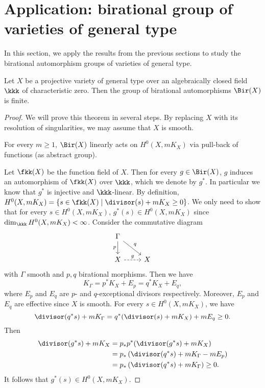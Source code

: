 \section{Application: birational group of varieties of general type}

    In this section, we apply the results from the previous sections to study the birational automorphism groups of varieties of general type.

    \begin{theorem}\label{thm:birational_group_of_varieties_of_general_type}
        Let \(X\) be a projective variety of general type over an algebraically closed field \(\kkk\) of characteristic zero. 
        Then the group of birational automorphisms \(\Bir(X)\) is finite.
    \end{theorem}
    \begin{proof}
        We will prove this theorem in several steps.
        By replacing \(X\) with its resolution of singularities, we may assume that \(X\) is smooth.

        \begin{step}\label{step_in_thm:birational_group_of_varieties_of_general_type:pluricanonical_representation}
            For every \(m \geq 1\), \(\Bir(X)\) linearly acts on \(H^0(X, mK_X)\) via pull-back of functions (as abstract group).
        \end{step}

        Let \(\fkk(X)\) be the function field of \(X\).
        Then for every \(g \in \Bir(X)\), \(g\) induces an automorphism of \(\fkk(X)\) over \(\kkk\), which we denote by \(g^*\).
        In particular we know that \(g^*\) is injective and \(\kkk\)-linear.
        By definition, \(H^0(X,mK_X) = \{ s \in \fkk(X) \mid \divisor(s) + mK_X \geq 0 \} \).
        We only need to show that for every \(s \in H^0(X,mK_X)\), \(g^*(s) \in H^0(X,mK_X)\) since \(\dim_\kkk H^0(X,mK_X) < \infty\).
        Consider the commutative diagram
        \[ \begin{tikzcd}
            \Gamma \arrow[d, "p"'] \arrow[rd, "q"] & \\
            X \arrow[r, dashed, "g"] & X
        \end{tikzcd} \]
        with \(\Gamma\) smooth and \(p,q\) birational morphisms.
        Then we have
        \[ K_\Gamma = p^*K_X + E_p = q^*K_X + E_q, \]
        where \(E_p\) and \(E_q\) are \(p\)- and \(q\)-exceptional divisors respectively.
        Moreover, \(E_p\) and \(E_q\) are effective since \(X\) is smooth.
        For every \(s \in H^0(X,mK_X)\), we have
        \[ \divisor (q^*s) + mK_\Gamma = q^*(\divisor(s) + mK_X) + mE_q \geq 0. \]
        Then
        \begin{align*}
            \divisor (g^*s) + mK_X &= p_* p^*(\divisor (g^*s) + mK_X) \\
            &= p_* \left(\divisor (q^*s) + mK_\Gamma - mE_p\right) \\
            &= p_* \left(\divisor (q^*s) + mK_\Gamma\right) \geq 0.
        \end{align*}
        It follows that \(g^*(s) \in H^0(X,mK_X)\).


\end{proof}
